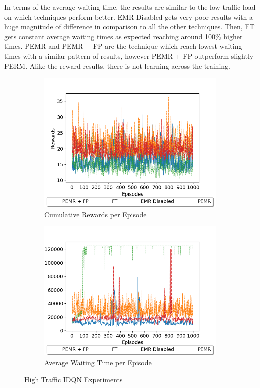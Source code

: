 \documentclass{llncs}
\begin{document}
In terms of the average waiting time, the results are similar to the low traffic load on which techniques perform better. EMR Disabled gets very poor results with a huge magnitude of difference in comparison to all the other techniques. Then, FT gets constant average waiting times as expected reaching around 100$\%$ higher times. PEMR and PEMR + FP are the technique which reach lowest waiting times with a similar pattern of results, however PEMR + FP outperform slightly PERM. Alike the reward results, there is not learning across the training.

\begin{figure}
    \centering
    \begin{subfigure}[b]{0.48\textwidth}
        \includegraphics[width=\textwidth]{images/High-Load-REW.png}
  		\caption{Cumulative Rewards per Episode}
  		\label{fig:HighIDQNREW}
    \end{subfigure}
    \begin{subfigure}[b]{0.48\textwidth}
        \includegraphics[width=\textwidth]{images/High-Load-AWT.png}
  		\caption{Average Waiting Time per Episode}
  		\label{fig:HighIDQNAWT}
    \end{subfigure}
    \caption{High Traffic IDQN Experiments}\label{fig:HighIDQNExp}
\end{figure}
\end{document}
